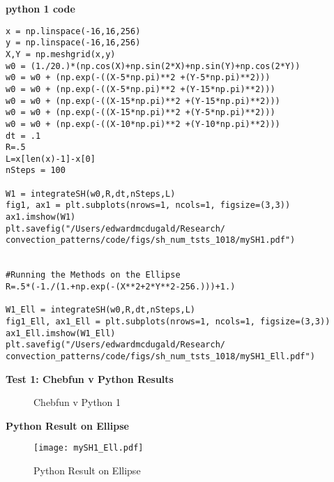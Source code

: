 \documentclass[12pt]{article}
\begin{document}
\textbf{python 1 code}
\begin{verbatim}
x = np.linspace(-16,16,256)
y = np.linspace(-16,16,256)
X,Y = np.meshgrid(x,y)
w0 = (1./20.)*(np.cos(X)+np.sin(2*X)+np.sin(Y)+np.cos(2*Y))
w0 = w0 + (np.exp(-((X-5*np.pi)**2 +(Y-5*np.pi)**2)))
w0 = w0 + (np.exp(-((X-5*np.pi)**2 +(Y-15*np.pi)**2)))
w0 = w0 + (np.exp(-((X-15*np.pi)**2 +(Y-15*np.pi)**2)))
w0 = w0 + (np.exp(-((X-15*np.pi)**2 +(Y-5*np.pi)**2)))
w0 = w0 + (np.exp(-((X-10*np.pi)**2 +(Y-10*np.pi)**2)))
dt = .1
R=.5
L=x[len(x)-1]-x[0]
nSteps = 100

W1 = integrateSH(w0,R,dt,nSteps,L)
fig1, ax1 = plt.subplots(nrows=1, ncols=1, figsize=(3,3))
ax1.imshow(W1)
plt.savefig("/Users/edwardmcdugald/Research/
convection_patterns/code/figs/sh_num_tsts_1018/mySH1.pdf")


#Running the Methods on the Ellipse
R=.5*(-1./(1.+np.exp(-(X**2+2*Y**2-256.)))+1.)

W1_Ell = integrateSH(w0,R,dt,nSteps,L)
fig1_Ell, ax1_Ell = plt.subplots(nrows=1, ncols=1, figsize=(3,3))
ax1_Ell.imshow(W1_Ell)
plt.savefig("/Users/edwardmcdugald/Research/
convection_patterns/code/figs/sh_num_tsts_1018/mySH1_Ell.pdf")
\end{verbatim}
\FloatBarrier


\textbf{Test 1: Chebfun v Python Results}
\begin{figure}[!tbp]
  \centering
  \hfill
  \caption{Chebfun v Python 1}
\end{figure}
\FloatBarrier

\textbf{Python Result on Ellipse}
\begin{figure}[ht]
        \centering
        \texttt{[image: mySH1\_Ell.pdf]}
        \label{fig:1}
        \caption{Python Result on Ellipse}
\end{figure}
\FloatBarrier
\end{document}
